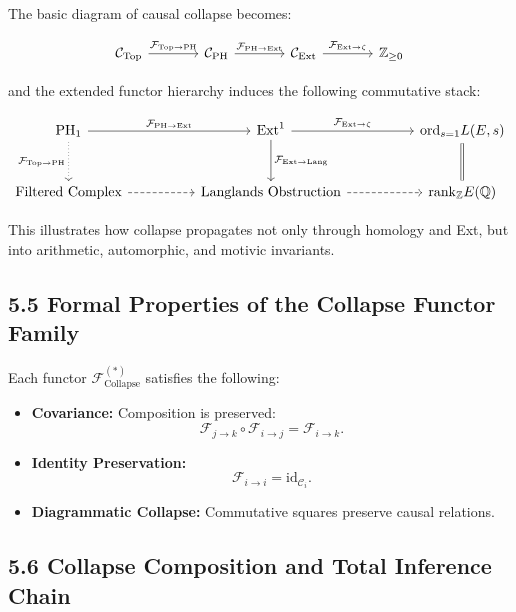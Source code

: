 \documentclass[11pt]{article}
\begin{document}
The basic diagram of causal collapse becomes:

\[
\begin{tikzcd}[row sep=large, column sep=large]
\mathcal{C}_{\mathrm{Top}} \arrow[r, "\mathcal{F}_{\mathrm{Top} \to \mathrm{PH}}"]
& \mathcal{C}_{\mathrm{PH}} \arrow[r, "\mathcal{F}_{\mathrm{PH} \to \mathrm{Ext}}"]
& \mathcal{C}_{\mathrm{Ext}} \arrow[r, "\mathcal{F}_{\mathrm{Ext} \to \zeta}"]
& \mathbb{Z}_{\geq 0}
\end{tikzcd}
\]

and the extended functor hierarchy induces the following commutative stack:

\[
\begin{tikzcd}[row sep=large, column sep=huge]
\mathrm{PH}_1 \arrow[r, "\mathcal{F}_{\mathrm{PH} \to \mathrm{Ext}}"] \arrow[d, dotted, "\mathcal{F}_{\mathrm{Top} \to \mathrm{PH}}"']
& \mathrm{Ext}^1 \arrow[r, "\mathcal{F}_{\mathrm{Ext} \to \zeta}"] \arrow[d, "\mathcal{F}_{\mathrm{Ext} \to \mathrm{Lang}}"]
& \mathrm{ord}_{s=1} L(E,s) \arrow[d, equal] \\
\text{Filtered Complex} \arrow[r, dashed]
& \mathrm{Langlands \ Obstruction} \arrow[r, dashed]
& \mathrm{rank}_{\mathbb{Z}} E(\mathbb{Q})
\end{tikzcd}
\]

This illustrates how collapse propagates not only through homology and Ext, but into arithmetic, automorphic, and motivic invariants.

\subsection{5.5 Formal Properties of the Collapse Functor Family}

Each functor $\mathcal{F}^{(*)}_{\mathrm{Collapse}}$ satisfies the following:

\begin{itemize}
  \item \textbf{Covariance:} Composition is preserved:
  \[
  \mathcal{F}_{j \to k} \circ \mathcal{F}_{i \to j} = \mathcal{F}_{i \to k}.
  \]
  \item \textbf{Identity Preservation:}
  \[
  \mathcal{F}_{i \to i} = \mathrm{id}_{\mathcal{C}_i}.
  \]
  \item \textbf{Diagrammatic Collapse:}  
  Commutative squares preserve causal relations.
\end{itemize}

\subsection{5.6 Collapse Composition and Total Inference Chain}
\end{document}
